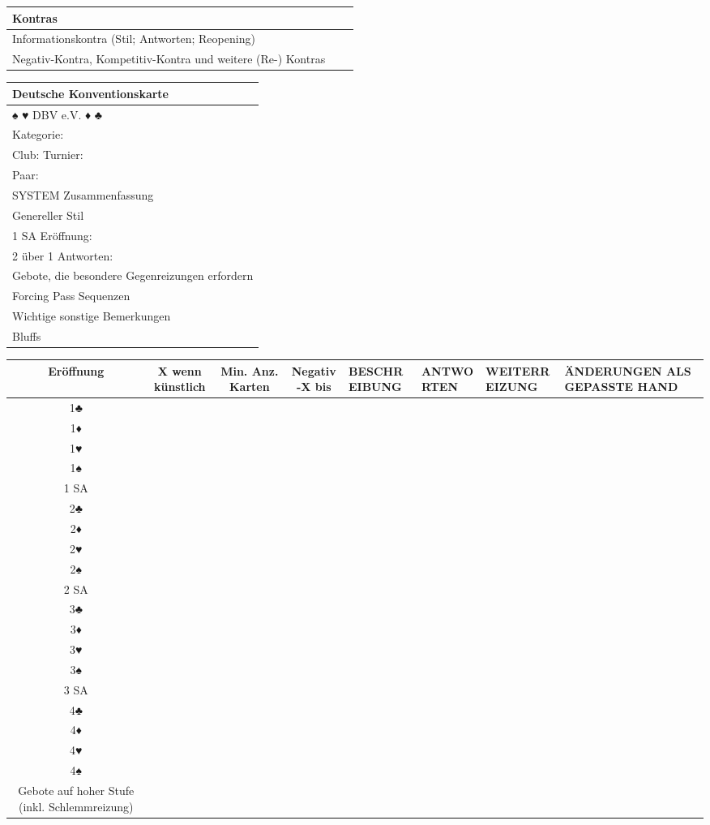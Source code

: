 \documentclass{article}
\begin{document}
\begin{multicols}{3}
\begin{tabular}{|l|l|l|}
\hline Kontras \\
\hline Informationskontra (Stil; Antworten; Reopening) \\
\hline Negativ-Kontra, Kompetitiv-Kontra und weitere (Re-) Kontras \\
\hline \end{tabular}

\begin{tabular}{|l|}
\hline Deutsche Konventionskarte \\
\hline ♠ ♥ DBV e.V. ♦ ♣ \\
\hline Kategorie: \\
Club: Turnier: \\
\hline Paar: \\

\hline SYSTEM Zusammenfassung \\
\hline Genereller Stil \\
\hline 1 SA Eröffnung: \\
\hline 2 über 1 Antworten: \\
\hline Gebote, die besondere Gegenreizungen erfordern \\
\hline Forcing Pass Sequenzen \\
\hline Wichtige sonstige Bemerkungen \\
\hline Bluffs \\
\hline \end{tabular}

\end{multicols}

\begin{tabular}{|c|c|c|c|l|l|l|l|}
\hline Eröffnung &
 X wenn künstlich &
 Min. Anz. Karten &
 Negativ-X bis &
 BESCHREIBUNG &
 ANTWORTEN &
 WEITERREIZUNG &
 ÄNDERUNGEN ALS GEPASSTE HAND \\
\hline 1♣ & & & & & & & \\
\hline 1♦ & & & & & & & \\
\hline 1♥ & & & & & & & \\
\hline 1♠ & & & & & & & \\
\hline 1 SA & & & & & & & \\
\hline 2♣ & & & & & & & \\
\hline 2♦ & & & & & & & \\
\hline 2♥ & & & & & & & \\
\hline 2♠ & & & & & & & \\
\hline 2 SA & & & & & & & \\
\hline 3♣ & & & & & & & \\
\hline 3♦ & & & & & & & \\
\hline 3♥ & & & & & & & \\
\hline 3♠ & & & & & & & \\
\hline 3 SA & & & & & & & \\
\hline 4♣ & & & & & & & \\
\hline 4♦ & & & & & & & \\
\hline 4♥ & & & & & & & \\
\hline 4♠ & & & & & & & \\
\hline Gebote auf hoher Stufe (inkl. Schlemmreizung) & & & & & & & \\
\end{tabular}
\end{document}
